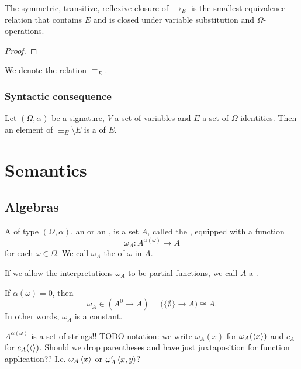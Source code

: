 \begin{lemma}
The symmetric, transitive, reflexive closure of $\to_E$ is the smallest equivalence relation that contains $E$ and is closed under variable substitution and $\Omega$-operations.
\end{lemma}
\begin{proof}

\end{proof}

\begin{definition}
We denote the relation $\equiv_E$.
\end{definition}

\subsubsection{Syntactic consequence}
\begin{definition}
Let $(\Omega, \alpha)$ be a signature, $V$ a set of variables and $E$ a set of $\Omega$-identities. Then an element of $\equiv_E\setminus E$ is a  of $E$.
\end{definition}

\section{Semantics}
\subsection{Algebras}
\begin{definition}
A  of type $(\Omega,\alpha)$, an  or an , is a set $A$, called the , equipped with a function
\[ \omega_A: A^{\alpha(\omega)}\to A \]
for each $\omega\in\Omega$. We call $\omega_A$ the  of $\omega$ in $A$.

If we allow the interpretations $\omega_A$ to be partial functions, we call $A$ a .
\end{definition}
If $\alpha(\omega) = 0$, then
\[ \omega_A\in (A^0\to A) = \big(\{\emptyset\}\to A\big) \cong A. \]
In other words, $\omega_A$ is a constant.



$A^{\alpha(\omega)}$ is a set of strings!!
TODO notation: we write $\omega_A(x)$ for $\omega_A(\left\langle x \right\rangle)$ and
$c_A$ for $c_A(\left\langle  \right\rangle)$. Should we drop parentheses and have just juxtaposition for function application?? I.e. $\omega_A\left\langle x \right\rangle$ or $\omega'_A\left\langle x,y \right\rangle$?


